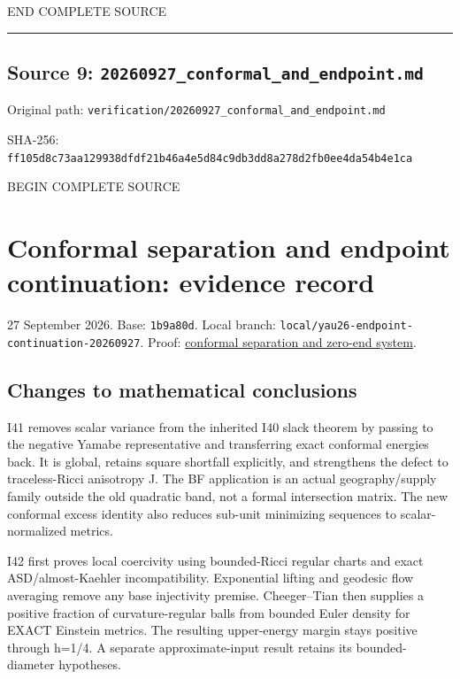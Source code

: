 \documentclass[
  10pt,
]{article}
\begin{document}
END COMPLETE SOURCE

\begin{center}\rule{0.5\linewidth}{0.5pt}\end{center}

\hypertarget{source-9-20260927_conformal_and_endpoint.md}{%
\subsection{Source 9:
\nolinkurl{20260927_conformal_and_endpoint.md}}\label{source-9-20260927_conformal_and_endpoint.md}}

Original path:
\nolinkurl{verification/20260927_conformal_and_endpoint.md}

SHA-256:
\nolinkurl{ff105d8c73aa129938dfdf21b46a4e5d84c9db3dd8a278d2fb0ee4da54b4e1ca}

BEGIN COMPLETE SOURCE

\hypertarget{conformal-separation-and-endpoint-continuation-evidence-record}{%
\section{Conformal separation and endpoint continuation: evidence
record}\label{conformal-separation-and-endpoint-continuation-evidence-record}}

27 September 2026. Base: \texttt{1b9a80d}. Local branch:
\nolinkurl{local/yau26-endpoint-continuation-20260927}. Proof:
\href{../continuation/20260927_conformal_separation_and_zero_end.md}{conformal
separation and zero-end system}.

\hypertarget{changes-to-mathematical-conclusions}{%
\subsection{Changes to mathematical
conclusions}\label{changes-to-mathematical-conclusions}}

I41 removes scalar variance from the inherited I40 slack theorem by
passing to the negative Yamabe representative and transferring exact
conformal energies back. It is global, retains square shortfall
explicitly, and strengthens the defect to traceless-Ricci anisotropy J.
The BF application is an actual geography/supply family outside the old
quadratic band, not a formal intersection matrix. The new conformal
excess identity also reduces sub-unit minimizing sequences to
scalar-normalized metrics.

I42 first proves local coercivity using bounded-Ricci regular charts and
exact ASD/almost-Kaehler incompatibility. Exponential lifting and
geodesic flow averaging remove any base injectivity premise.
Cheeger--Tian then supplies a positive fraction of curvature-regular
balls from bounded Euler density for EXACT Einstein metrics. The
resulting upper-energy margin stays positive through h=1/4. A separate
approximate-input result retains its bounded-diameter hypotheses.
\end{document}
